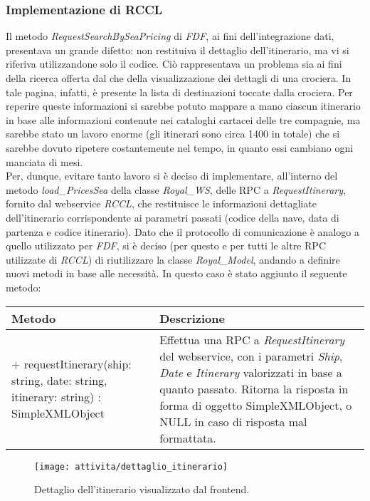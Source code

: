 \subsubsection{Implementazione di RCCL}
Il metodo \textit{RequestSearchBySeaPricing} di \textit{FDF}, ai fini dell'integrazione dati, presentava un grande difetto: non restituiva il dettaglio dell'itinerario, ma vi si riferiva utilizzandone solo il codice. Ciò rappresentava un problema sia ai fini della ricerca offerta dal \bookingEngine che della visualizzazione dei dettagli di una crociera. In tale pagina, infatti, è presente la lista di destinazioni toccate dalla crociera. Per reperire queste informazioni si sarebbe potuto mappare a mano ciascun itinerario in base alle informazioni contenute nei cataloghi cartacei delle tre compagnie, ma sarebbe stato un lavoro enorme (gli itinerari sono circa 1400 in totale) che si sarebbe dovuto ripetere costantemente nel tempo, in quanto essi cambiano ogni manciata di mesi.\\
Per, dunque, evitare tanto lavoro si è deciso di implementare, all'interno del metodo \textit{load\_PricesSea} della classe \textit{Royal\_WS}, delle \gls{RPC} a \textit{RequestItinerary}, fornito dal \gls{webservice} \textit{RCCL}, che restituisce le informazioni dettagliate dell'itinerario corrispondente ai parametri passati (codice della nave, data di partenza e codice itinerario).  Dato che il protocollo di comunicazione è analogo a quello utilizzato per \textit{FDF}, si è deciso (per questo e per tutti le altre \gls{RPC} utilizzate di \textit{RCCL}) di riutilizzare la classe \textit{Royal\_Model}, andando a definire nuovi metodi in base alle necessità. In questo caso è stato aggiunto il seguente metodo: 
\begin{center}
	\def\arraystretch{1.5}
	\begin{longtable}{ >{\raggedright}p{5.5cm} p{6.8cm}} 
		\hline
		\textbf{Metodo} & \textbf{Descrizione} \\
		\hline
		+ requestItinerary(ship: string, date: string, itinerary: string) : SimpleXMLObject & Effettua una \gls{RPC} a \textit{RequestItinerary} del \gls{webservice}, con i parametri \textit{Ship}, \textit{Date} e \textit{Itinerary} valorizzati in base a quanto passato. Ritorna la risposta in forma di oggetto SimpleXMLObject, o NULL in caso di risposta mal formattata.\\
		\hline
	\end{longtable}
\end{center}
\begin{figure}[!h] 
	\centering 
	\texttt{[image: attivita/dettaglio\_itinerario]} 
	\caption{Dettaglio dell'itinerario visualizzato dal frontend.}
\end{figure}
